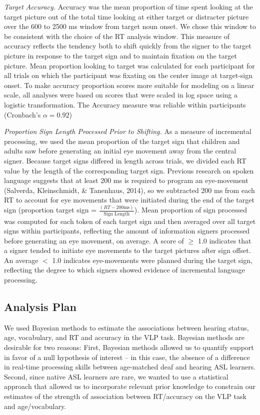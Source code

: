 \documentclass[oneside]{report}
\begin{document}
\emph{Target Accuracy.} Accuracy was the mean proportion of time spent
looking at the target picture out of the total time looking at either
target or distracter picture over the 600 to 2500 ms window from target
noun onset. We chose this window to be consistent with the choice of the
RT analysis window. This measure of accuracy reflects the tendency both
to shift quickly from the signer to the target picture in response to
the target sign and to maintain fixation on the target picture. Mean
proportion looking to target was calculated for each participant for all
trials on which the participant was fixating on the center image at
target-sign onset. To make accuracy proportion scores more suitable for
modeling on a linear scale, all analyses were based on scores that were
scaled in log space using a logistic transformation. The Accuracy
measure was reliable within participants (Cronbach's \(\alpha = 0.92\))

\emph{Proportion Sign Length Processed Prior to Shifting.} As a measure
of incremental processing, we used the mean proportion of the target
sign that children and adults saw before generating an initial eye
movement away from the central signer. Because target signs differed in
length across trials, we divided each RT value by the length of the
corresponding target sign. Previous research on spoken language suggests
that at least 200 ms is required to program an eye-movement (Salverda,
Kleinschmidt, \& Tanenhaus, 2014), so we subtracted 200 ms from each RT
to account for eye movements that were initiated during the end of the
target sign (proportion target sign =
\(\frac{(RT-200 \text{ms})}{\text{Sign Length}}\)). Mean proportion of
sign processed was computed for each token of each target sign and then
averaged over all target signs within participants, reflecting the
amount of information signers processed before generating an eye
movement, on average. A score of \(\geq\) 1.0 indicates that a signer
tended to initiate eye movements to the target pictures after sign
offset. An average \(<\) 1.0 indicates eye-movements were planned during
the target sign, reflecting the degree to which signers showed evidence
of incremental language processing.

\hypertarget{analysis-plan}{%
\subsection{Analysis Plan}\label{analysis-plan}}

We used Bayesian methods to estimate the associations between hearing
status, age, vocabulary, and RT and accuracy in the VLP task. Bayesian
methods are desirable for two reasons: First, Bayesian methods allowed
us to quantify support in favor of a null hypothesis of interest -- in
this case, the absence of a difference in real-time processing skills
between age-matched deaf and hearing ASL learners. Second, since native
ASL learners are rare, we wanted to use a statistical approach that
allowed us to incorporate relevant prior knowledge to constrain our
estimates of the strength of association between RT/accuracy on the VLP
task and age/vocabulary.
\end{document}
